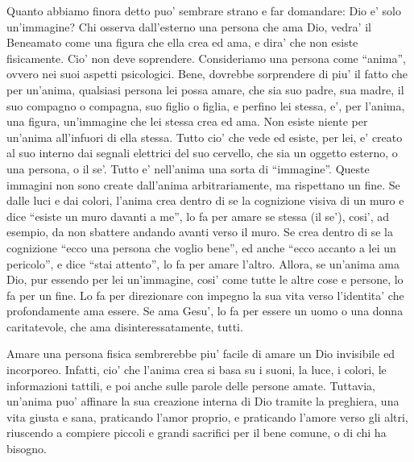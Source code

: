 Quanto abbiamo finora detto puo' sembrare strano e far domandare: Dio e' solo un'immagine? Chi osserva dall'esterno una persona che ama Dio, vedra' il Beneamato come una figura che ella crea ed ama, e dira' che non esiste fisicamente. Cio' non deve soprendere. Consideriamo una persona come ``anima'', ovvero nei suoi aspetti psicologici. Bene, dovrebbe sorprendere di piu' il fatto che per un'anima, qualsiasi persona lei possa amare, che sia suo padre, sua madre, il suo compagno o compagna, suo figlio o figlia, e perfino lei stessa, e', per l'anima, una figura, un'immagine che lei stessa crea ed ama. Non esiste niente per un'anima all'infuori di ella stessa. Tutto cio' che vede ed esiste, per lei, e' creato al suo interno dai segnali elettrici del suo cervello, che sia un oggetto esterno, o una persona, o il se'.  Tutto e' nell'anima una sorta di ``immagine''. Queste immagini non sono create dall'anima arbitrariamente, ma rispettano un fine. Se dalle luci e dai colori, l'anima crea dentro di se la cognizione visiva di un muro e dice ``esiste un muro davanti a me'', lo fa per amare se stessa (il se'), cosi', ad esempio, da non sbattere andando avanti verso il muro. Se crea dentro di se la cognizione ``ecco una persona che voglio bene'', ed anche ``ecco accanto a lei un pericolo'', e dice ``stai attento'', lo fa per amare l'altro. Allora, se un'anima ama Dio, pur essendo per lei un'immagine, cosi' come tutte le altre cose e persone, lo fa per un fine. Lo fa per direzionare con impegno la sua vita verso l'identita' che profondamente ama essere. Se ama Gesu', lo fa per essere un uomo o una donna caritatevole, che ama disinteressatamente, tutti.

Amare una persona fisica sembrerebbe piu' facile di amare un Dio invisibile ed incorporeo. Infatti, cio' che l'anima crea si basa su i suoni, la luce, i colori, le informazioni tattili, e poi anche sulle parole delle persone amate. Tuttavia, un'anima puo' affinare la sua creazione interna di Dio tramite la preghiera, una vita giusta e sana, praticando l'amor proprio, e praticando l'amore verso gli altri, riuscendo a compiere piccoli e grandi sacrifici per il bene comune, o di chi ha bisogno. 

